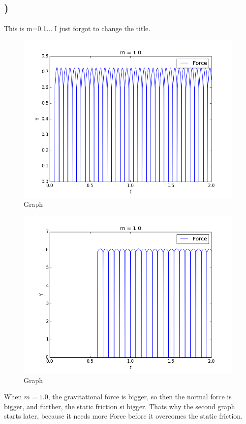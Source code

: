\documentclass[a4paper,10pt,norsk]{article}
\begin{document}
\subsection{)}
This is m=0.1... I just forgot to change the title.
\begin{figure}[h!]
        \centering 
        \includegraphics[scale=0.5]{oppg_t_1.png} 
        \caption{Graph}
\end{figure}

\begin{figure}[h!]
        \centering 
        \includegraphics[scale=0.5]{oppg_t_2.png} 
        \caption{Graph}
\end{figure}

When $m = 1.0$, the gravitational force is bigger, so then the normal force is bigger, and further, the static friction si bigger.
Thats why the second graph starts later, because it needs more Force before it overcomes the static friction.
\end{document}
